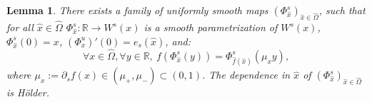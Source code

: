 \documentclass[a4paper]{article}
\newtheorem{lemma}[theorem]{Lemma}
\theoremstyle{definition}
\begin{document}
\begin{lemma}
There exists a family of uniformly smooth maps $(\Phi^s_{\widehat{x}})_{\widehat{x} \in \widehat{\Omega}}$, such that for all $\widehat{x} \in \widehat{\Omega}$ $\Phi_{\widehat{x}}^s : \mathbb{R} \longrightarrow W^s(x)$
is a smooth parametrization of $W^s(x)$, $\Phi_{\widehat{x}}^s(0)=x$, $(\Phi_x^u)'(0)=e_s(\widehat{x})$, and:
$$ \forall x \in \widehat{\Omega}, \forall y \in \mathbb{R},  \ f\left( \Phi_{\widehat{x}}^s(y) \right) = \Phi_{\widehat{f}(\widehat{x})}^s( \mu_x y ),  $$
where ${\mu}_x := \partial_s f(x) \in (\mu_+,\mu_-) \subset (0,1)$. The dependence in $\widehat{x}$ of $(\Phi_{\widehat{x}}^s)_{\widehat{x} \in \widehat{\Omega}}$ is Hölder.
\end{lemma}

\end{document}

